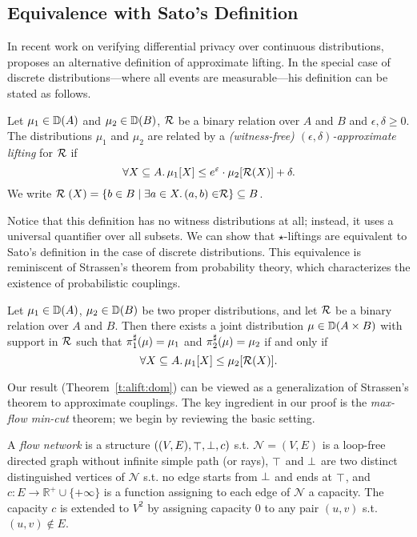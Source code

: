 \documentclass{lmcs}
\begin{document}
\subsection{Equivalence with Sato's Definition}

In recent work on verifying differential privacy over continuous distributions,
\citet{Sato16} proposes an alternative definition of approximate lifting. In the
special case of discrete distributions---where all events are measurable---his
definition can be stated as follows.

\begin{defi}
  Let $\mu_1 \in {\mathbb{D}}(A)$ and $\mu_2 \in {\mathbb{D}}(B)$, $\mathrel{\mathcal{R}}$ be a binary relation
  over $A$ and $B$ and $\epsilon, \delta \geq 0$.  The distributions
  $\mu_1$ and $\mu_2$ are related by a \emph{(witness-free)
  $(\epsilon,\delta)$-approximate lifting} for $\mathrel{\mathcal{R}}$ if
  \[
    \forall X \subseteq A .\, \mu_1[X] \leq e^\varepsilon \cdot
    \mu_2[\mathcal{R}(X)] + \delta .
  \]
  We write $\mathrel{\mathcal{R}}(X) = \{ b \in B \mid \exists a \in X.\, (a, b) \in \mathrel{\mathcal{R}} \}
  \subseteq B$.
\end{defi}

Notice that this definition has no witness distributions at all; instead, it
uses a universal quantifier over all subsets.  We can show that
$\star$-liftings are equivalent to Sato's definition in the case of
discrete distributions. This equivalence is reminiscent of Strassen's
theorem from probability theory, which characterizes the existence of
probabilistic couplings.
%
\begin{thm}
  Let $\mu_1 \in {\mathbb{D}}(A)$, $\mu_2 \in {\mathbb{D}}(B)$ be two proper distributions,
  and let $\mathcal{R}$ be a binary relation over $A$ and $B$. Then there exists
  a joint distribution $\mu \in {\mathbb{D}}(A \times B)$ with support in $\mathcal{R}$ such
  that $\pi_{1}^{\sharp}(\mu) = \mu_1$ and $\pi_{2}^{\sharp}(\mu) = \mu_2$ if and only if
  \[
    \forall X \subseteq A .\, \mu_1[X] \leq \mu_2[\mathcal{R}(X)] .
  \]
\end{thm}
%
Our result (Theorem~\ref{t:alift:dom}) can be viewed as a generalization of
Strassen's theorem to approximate couplings. The key ingredient in our proof is
the \emph{max-flow min-cut} theorem; we begin by reviewing the basic setting.

\begin{defi}
  A \emph{flow network} is a structure $((V, E), \mathop{\top}, \mathop{\perp}, c)$
  s.t.  $\mathcal{N} = (V, E)$ is a loop-free directed graph without
  infinite simple path (or rays), $\mathop{\top}$ and $\mathop{\perp}$ are two distinct
  distinguished vertices of $\mathcal{N}$ s.t. no edge starts from
  $\mathop{\perp}$ and ends at $\mathop{\top}$, and
  $c : E \to \mathbb{R}^+ \cup \{ +\infty \}$
  is a function assigning to each edge of $\mathcal{N}$ a capacity. The capacity
  $c$ is extended to $V^2$ by assigning capacity $0$ to any pair
  $(u, v)$ s.t. $(u, v) \notin E$.
\end{defi}
\end{document}
